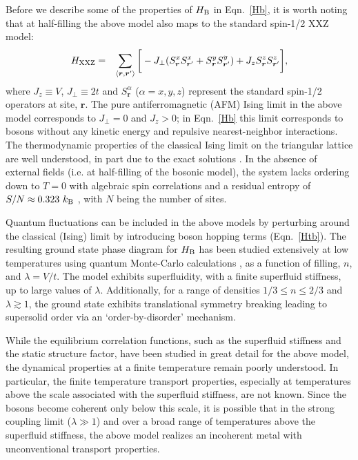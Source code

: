 \documentclass[aps,prx,onecolumn,amsmath,nofootinbib,amssymb,11pt]{revtex4-1}
\renewcommand{\vec}[1]{\boldsymbol{#1}}
\def \r {{\vec r}}
\def \kb {k_\tn{B}}
\def \beq {\begin{eqnarray}}
\def \eeq {\end{eqnarray}}
\def \tn {\textnormal}
\def \la{\langle}
\def \ra{\rangle}
\def \hb {H_{\tn{B}}}
\begin{document}
Before we describe some of the properties of $\hb$ in Eqn.~\ref{Hb}, it is worth noting that at half-filling the above model also maps to the standard spin-1/2 XXZ model: 
\beq
H_{\tn{XXZ}} &=& \sum_{\la\r,\r'\ra} \bigg[-J_\perp(S_\r^x S_{\r'}^x + S_\r^y S_{\r'}^y) + J_z S_\r^z S_{\r'}^z \bigg], 
\label{Hxxz}
\eeq
where $J_z \equiv V$, $J_\perp \equiv 2t$ and $S_\r^\alpha$ ($\alpha=x,y,z$) represent the standard spin-1/2 operators at site, $\r$. The pure antiferromagnetic (AFM) Ising limit in the above model corresponds to $J_\perp=0$ and  $J_z>0$; in Eqn.~\ref{Hb} this limit corresponds to bosons without any kinetic energy and repulsive  nearest-neighbor interactions.  The thermodynamic properties of the classical Ising limit on the triangular lattice are well understood, in part due to the exact solutions \cite{WannierTriaglat,WannierTriaglat2}. In the absence of external fields (i.e. at half-filling of the bosonic model), the system lacks ordering down to $T=0$ with algebraic spin correlations \cite{StephensonCorr} and a residual entropy of $S/N \approx 0.323 ~\kb$ \cite{HOUTAPPEL1950}, with $N$ being the number  of sites.

Quantum fluctuations can be included in the above models by perturbing around the classical (Ising) limit by introducing boson hopping terms (Eqn.~\ref{Htb}). The resulting ground state phase diagram for $\hb$ has been studied extensively at low temperatures using quantum Monte-Carlo calculations \cite{melko,troyer,damle}, as a function of filling, $n$, and $\lambda=V/t$. The model exhibits superfluidity, with a finite superfluid stiffness, up to large values of $\lambda$. Additionally, for a range of densities $1/3\leq n\leq 2/3$ and $\lambda\gtrsim 1$, the ground state exhibits translational symmetry breaking leading to supersolid order via an `order-by-disorder' mechanism. 

While the equilibrium correlation functions, such as the superfluid stiffness and the static structure factor, have been studied in great detail for the above model, the dynamical properties at a finite temperature remain poorly understood. In particular, the finite temperature transport properties, especially at temperatures above the scale associated with the superfluid stiffness, are not known. Since the bosons become coherent only below this scale, it is possible that in the strong coupling limit ($\lambda\gg1$) and over a broad range of temperatures above the superfluid stiffness, the above model realizes an incoherent metal with unconventional transport properties. 
\end{document}
